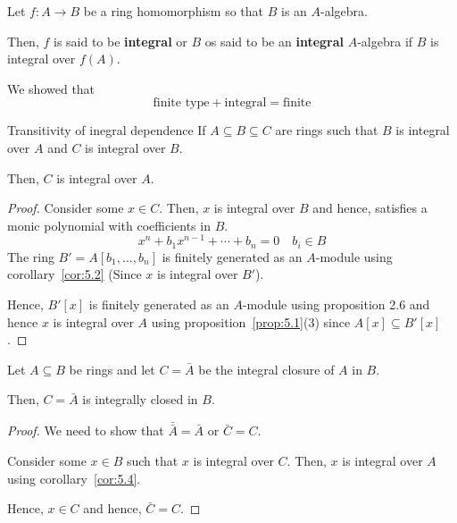 \begin{note}{}{}
	Let \(f \colon A \to B\) be a ring homomorphism
	so that \(B\) is an \(A\)-algebra.

	Then, \(f\) is said to be \textbf{integral} or \(B\) os said to be
	an \textbf{integral} \(A\)-algebra if \(B\) is integral over \(f(A)\).

	We showed that
	\[
		\text{finite type} + \text{integral} = \text{finite}
	\]
\end{note}


\begin{corollary}{Transitivity of inegral dependence}{}
\label{cor:5.4}
	If \(A \subseteq B \subseteq C\) are rings such that \(B\) is integral
	over \(A\) and \(C\) is integral over \(B\).

	Then, \(C\) is integral over \(A\).
\end{corollary}
\begin{proof}
	Consider some \(x \in C\).
	Then, \(x\) is integral over \(B\) and hence, satisfies a monic
	polynomial with coefficients in \(B\).
	\[
		x^n + b_1 x^{n-1} + \cdots + b_n = 0  \quad b_i \in B
	\]
	The ring \(B' = A[b_1, \ldots, b_n]\) is finitely generated as an
	\(A\)-module using corollary~\ref{cor:5.2}
	(Since \(x\) is integral over \(B'\)).

	Hence, \(B'[x]\) is finitely generated as an \(A\)-module using
	proposition 2.6 and hence \(x\) is integral over \(A\) using
	proposition~\ref{prop:5.1}(3) since \(A[x] \subseteq B'[x]\).
\end{proof}


\begin{corollary}{}{}
\label{cor:5.5}
	Let \(A \subseteq B\) be rings and let \(C = \bar{A}\) be the
	integral closure of \(A\) in \(B\).

	Then, \(C = \bar{A}\) is integrally closed in \(B\).
\end{corollary}
\begin{proof}
	We need to show that \(\bar{\bar{A}} = \bar{A}\) or \(\bar{C} = C\).

	Consider some \(x \in B\) such that \(x\) is integral over \(C\).
	Then, \(x\) is integral over \(A\) using corollary~\ref{cor:5.4}.

	Hence, \(x \in C\) and hence, \(\bar{C} = C\).
\end{proof}


